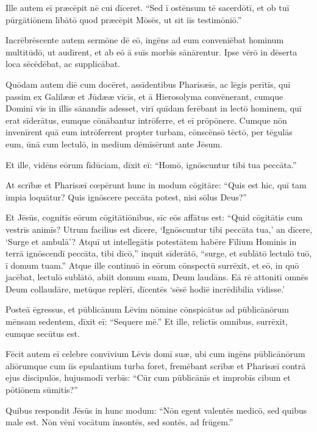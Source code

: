\Versus Ille autem eī præcēpit nē cui dīceret. ``Sed ī ostēnsum tē sacerdōtī, et ob tuī pūrgātiōnem lībātō quod præcēpit Mōsēs, ut sit iīs testimōniō.''

\Versus Incrēbrēscente autem sermōne dē eō, ingēns ad eum conveniēbat hominum multitūdō, ut audīrent, et ab eō ā suīs morbīs sānārentur.
\Versus Ipse vērō in dēserta loca sēcēdēbat, ac supplicābat.

\Versus Quōdam autem diē cum docēret, assīdentibus Pharisæīs, ac lēgis perītīs, quī passim ex Galilææ et Jūdææ vīcīs, et ā Hierosolyma convēnerant, cumque Dominī vīs in illīs sānandīs adesset,
\Versus virī quīdam ferēbant in lectō hominem, quī erat sīderātus, eumque cōnābantur intrōferre, et eī prōpōnere.
\Versus Cumque nōn invenīrent quā eum intrōferrent propter turbam, cōnscēnsō tēctō, per tēgulās eum, ūnā cum lectulō, in medium dēmīsērunt ante Jēsum.

\Versus Et ille, vidēns eōrum fīdūciam, dīxit eī: ``Homō, ignōscuntur tibi tua peccāta.''

\Versus At scrībæ et Pharisæī cœpērunt hunc in modum cōgitāre: ``Quis est hic, quī tam impia loquātur? Quis ignōscere peccāta potest, nisi sōlus Deus?''

\Versus Et Jēsūs, cognitīs eōrum cōgitātiōnibus, sīc eōs affātus est: ``Quid cōgitātis cum vestrīs animīs?
\Versus Utrum facilius est dīcere, `Ignōscuntur tibi peccāta tua,' an dīcere, `Surge et ambulā'?
\Versus Atquī ut intellegātis potestātem habēre Fīlium Hominis in terrā ignōscendī peccāta, tibi dīcō,'' inquit sīderātō, ``surge, et sublātō lectulō tuō, ī domum tuam.''
\Versus Atque ille continuō in eōrum cōnspectū surrēxit, et eō, in quō jacēbat, lectulō sublātō, abiit domum suam, Deum laudāns.
\Versus Eā rē attonitī omnēs Deum collaudāre, metūque replērī, dīcentēs `sēsē hodiē incrēdibilia vīdisse.'

\Versus Posteā ēgressus, et pūblicānum Lēvim nōmine cōnspicātus ad pūblicānōrum mēnsam sedentem, dīxit eī: ``Sequere mē.''
\Versus Et ille, relictīs omnibus, surrēxit, eumque secūtus est.

\Versus Fēcit autem eī celebre convīvium Lēvis domī suæ, ubi cum ingēns pūblicānōrum aliōrumque cum iīs epulantium turba foret,
\Versus fremēbant scrībæ et Pharisæī contrā ejus discipulōs, hujusmodī verbīs: ``Cūr cum pūblicānīs et improbīs cibum et pōtiōnem sūmitis?''

\Versus Quibus respondit Jēsūs in hunc modum: ``Nōn egent valentēs medicō, sed quibus male est.
\Versus Nōn vēnī vocātum īnsontēs, sed sontēs, ad frūgem.''

